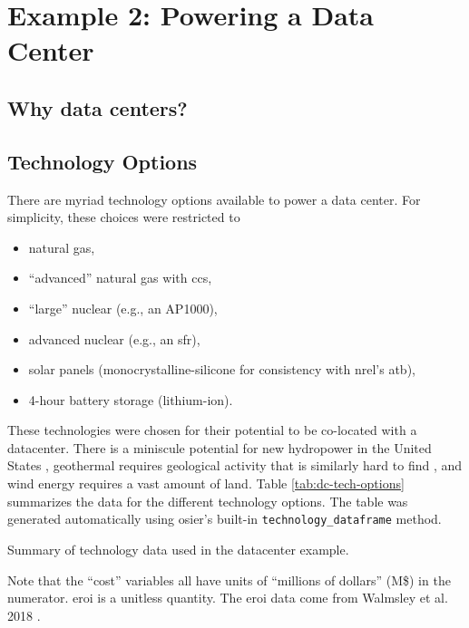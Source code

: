 \section{Example 2: Powering a Data Center}

\subsection{Why data centers?}

\subsection{Technology Options}
There are myriad technology options available to power a data center. For
simplicity, these choices were restricted to 
\begin{itemize}
    \item natural gas,
    \item ``advanced'' natural gas with \ac{ccs},
    \item ``large'' nuclear (e.g., an AP1000),
    \item advanced nuclear (e.g., an \ac{sfr}),
    \item solar panels (monocrystalline-silicone for consistency with \ac{nrel}'s \ac{atb}),
    \item 4-hour battery storage (lithium-ion).
\end{itemize}

\noindent
These technologies were chosen for their potential to be co-located with a datacenter. There is
a miniscule potential for new hydropower in the United States \cite{lopez_us_2012}, geothermal
requires geological activity that is similarly hard to find \cite{lopez_us_2012}, and wind energy
requires a vast amount of land.
Table \ref{tab:dc-tech-options} summarizes the data for the different technology
options. The table was generated automatically using \ac{osier}'s built-in
\texttt{technology\_dataframe} method. 
\begin{table}[htpb!]
    \centering
    \caption{Summary of technology data used in the datacenter example.}
    \label{tab:dc-tech-options}
    \resizebox{\columnwidth}{!}{}
\end{table}
\noindent
Note that the ``cost'' variables all have units of ``millions of dollars'' (M\$)
in the numerator. \ac{eroi} is a unitless quantity. The \ac{eroi} data come from
Walmsley et al. 2018 \cite{walmsley_energy_2018}.
 
\FloatBarrier


